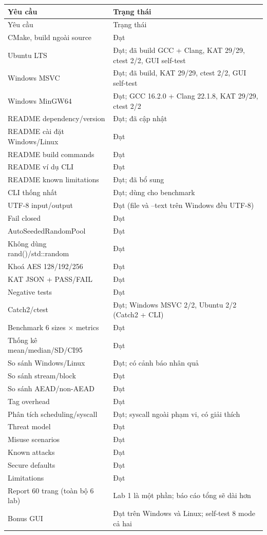 \documentclass[12pt,a4paper,oneside]{report}
\let\origtexttt\texttt
\renewcommand{\texttt}[1]{\origtexttt{\seqsplit{#1}}}
\begin{document}
\begin{longtable}{p{}p{}}
\toprule
Yêu cầu & Trạng thái \\
\midrule
\endfirsthead
\toprule
Yêu cầu & Trạng thái \\
\midrule
\endhead
CMake, build ngoài source & Đạt \\
Ubuntu LTS & Đạt; đã build GCC + Clang, KAT 29/29, ctest 2/2, GUI self-test \\
Windows MSVC & Đạt; đã build, KAT 29/29, ctest 2/2, GUI self-test \\
Windows MinGW64 & Đạt; GCC 16.2.0 + Clang 22.1.8, KAT 29/29, ctest 2/2 \\
README dependency/version & Đạt; đã cập nhật \\
README cài đặt Windows/Linux & Đạt \\
README build commands & Đạt \\
README ví dụ CLI & Đạt \\
README known limitations & Đạt; đã bổ sung \\
CLI thống nhất & Đạt; \texttt{--threads} dùng cho benchmark \\
UTF-8 input/output & Đạt (file và --text trên Windows đều UTF-8) \\
Fail closed & Đạt \\
AutoSeededRandomPool & Đạt \\
Không dùng rand()/std::random & Đạt \\
Khoá AES 128/192/256 & Đạt \\
KAT JSON + PASS/FAIL & Đạt \\
Negative tests & Đạt \\
Catch2/ctest & Đạt; Windows MSVC 2/2, Ubuntu 2/2 (Catch2 + CLI) \\
Benchmark 6 sizes × metrics & Đạt \\
Thống kê mean/median/SD/CI95 & Đạt \\
So sánh Windows/Linux & Đạt; có cảnh báo nhân quả \\
So sánh stream/block & Đạt \\
So sánh AEAD/non-AEAD & Đạt \\
Tag overhead & Đạt \\
Phân tích scheduling/syscall & Đạt; syscall ngoài phạm vi, có giải thích \\
Threat model & Đạt \\
Misuse scenarios & Đạt \\
Known attacks & Đạt \\
Secure defaults & Đạt \\
Limitations & Đạt \\
Report 60 trang (toàn bộ 6 lab) & Lab 1 là một phần; báo cáo tổng sẽ dài hơn \\
Bonus GUI & Đạt trên Windows và Linux; self-test 8 mode cả hai \\
\bottomrule
\end{longtable}
\end{document}
